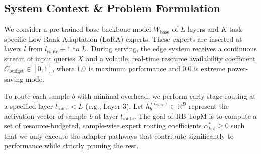 \subsection{System Context \& Problem Formulation}
We consider a pre-trained base backbone model $W_{\text{base}}$ of $L$ layers and $K$ task-specific Low-Rank Adaptation (LoRA) experts. These experts are inserted at layers $l$ from $l_{\text{route}} + 1$ to $L$. During serving, the edge system receives a continuous stream of input queries $X$ and a volatile, real-time resource availability coefficient $C_{\text{budget}} \in [0, 1]$, where $1.0$ is maximum performance and $0.0$ is extreme power-saving mode. 

To route each sample $b$ with minimal overhead, we perform early-stage routing at a specified layer $l_{\text{route}} < L$ (e.g., Layer 3). Let $h_b^{(l_{\text{route}})} \in \mathbb{R}^D$ represent the activation vector of sample $b$ at layer $l_{\text{route}}$. The goal of RB-TopM is to compute a set of resource-budgeted, sample-wise expert routing coefficients $\alpha^*_{k, b} \ge 0$ such that we only execute the adapter pathways that contribute significantly to performance while strictly pruning the rest.

\begin{table}[t]
\caption{\textbf{Notational Glossary of Primary Routing and Gating Variables in RB-TopM.}}
\label{tab:notational_glossary}
\vskip 0.1in
\begin{center}
\begin{small}
\begin{sc}
\end{sc}
\end{small}
\end{center}
\vskip -0.1in
\end{table}

